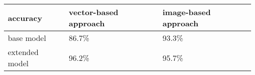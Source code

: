 \begin{table}[h]
\begin{tabular}{|l|l|l|}
\hline
accuracy    & vector-based approach & image-based approach \\ \hline
base model    & 86.7\%                & 93.3\%               \\ \hline
extended model & 96.2\%                 & 95.7\%               \\ \hline
\end{tabular}
\end{table}
